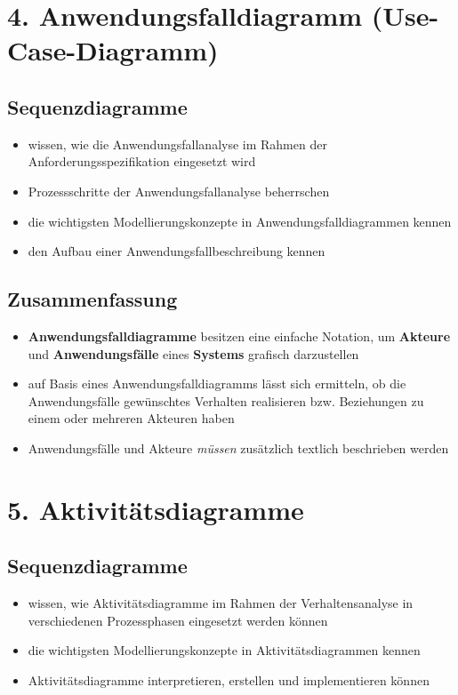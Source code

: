 \section*{4. Anwendungsfalldiagramm (Use-Case-Diagramm)}

\subsection*{Sequenzdiagramme}
\begin{itemize}
    \item wissen, wie die Anwendungsfallanalyse im Rahmen der Anforderungsspezifikation eingesetzt wird
    \item Prozessschritte der Anwendungsfallanalyse beherrschen
    \item die wichtigsten Modellierungskonzepte in Anwendungsfalldiagrammen kennen
    \item den Aufbau einer Anwendungsfallbeschreibung kennen
\end{itemize}

\subsection*{Zusammenfassung}

\begin{itemize}
    \item \textbf{Anwendungsfalldiagramme} besitzen eine einfache Notation, um \textbf{Akteure} und \textbf{Anwendungsfälle} eines \textbf{Systems} grafisch darzustellen
    \item auf Basis eines Anwendungsfalldiagramms lässt sich ermitteln, ob die Anwendungsfälle gewünschtes Verhalten realisieren bzw. Beziehungen zu einem oder mehreren Akteuren haben
    \item Anwendungsfälle und Akteure \textit{müssen} zusätzlich textlich beschrieben werden
\end{itemize}

\section*{5. Aktivitätsdiagramme}

\subsection*{Sequenzdiagramme}
\begin{itemize}
    \item wissen, wie Aktivitätsdiagramme im Rahmen der Verhaltensanalyse in verschiedenen Prozessphasen eingesetzt werden können
    \item die wichtigsten Modellierungskonzepte in Aktivitätsdiagrammen kennen
    \item Aktivitätsdiagramme interpretieren, erstellen und implementieren können
\end{itemize}

